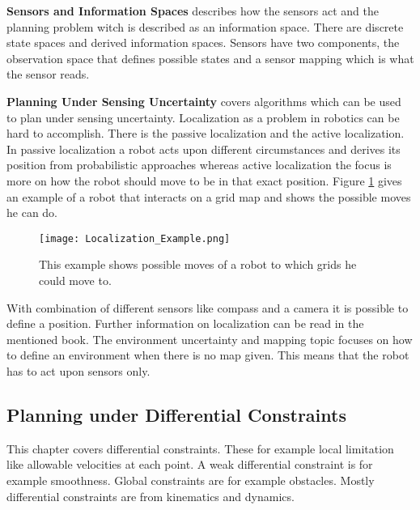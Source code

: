 \textbf{Sensors and Information Spaces} describes how the sensors act and the planning problem witch is described as an information space. There are discrete state spaces and derived information spaces. Sensors have two components, the observation space that defines possible states and a sensor mapping which is what the sensor reads. \cite{planning_algorithms_steven_m_lavalle}

\textbf{Planning Under Sensing Uncertainty} covers algorithms which can be used to plan under sensing uncertainty. Localization as a problem in robotics can be hard to accomplish. There is the passive localization and the active localization. In passive localization a robot acts upon different circumstances and derives its position from probabilistic approaches whereas active localization the focus is more on how the robot should move to be in that exact position. Figure \ref{fig:Localization Example} gives an example of a robot that interacts on a grid map and shows the possible moves he can do. \cite{planning_algorithms_steven_m_lavalle}
\begin{figure}[H]
    \centering
    \texttt{[image: Localization\_Example.png]}
    \caption{This example shows possible moves of a robot to which grids he could move to. \cite{planning_algorithms_steven_m_lavalle}}
    \label{fig:Localization Example}
\end{figure}

With combination of different sensors like compass and a camera it is possible to define a position. Further information on localization can be read in the mentioned book. The environment uncertainty and mapping topic focuses on how to define an environment when there is no map given. This means that the robot has to act upon sensors only. \cite{planning_algorithms_steven_m_lavalle}

\subsection{Planning under Differential Constraints} \label{sec:Planning under Differential Constraints}
This chapter covers differential constraints. These for example local limitation like allowable velocities at each point. A weak differential constraint is for example smoothness. Global constraints are for example obstacles. Mostly differential constraints are from kinematics and dynamics.


